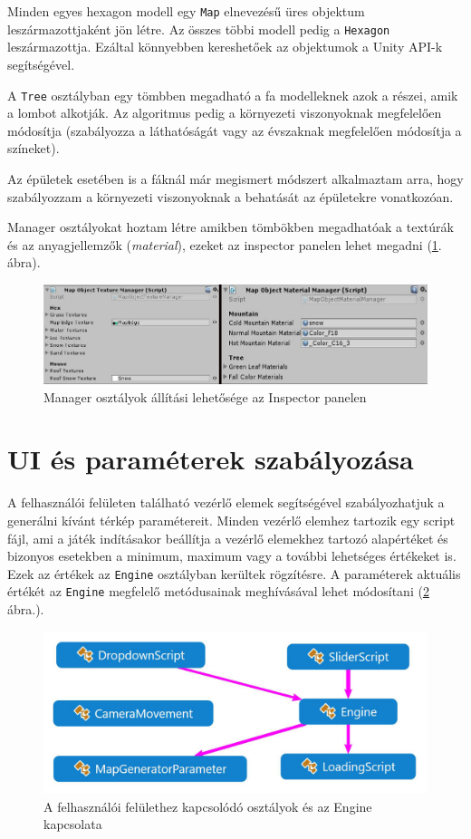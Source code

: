 Minden egyes hexagon modell egy \texttt{Map} elnevezésű üres objektum leszármazottjaként jön létre. Az összes többi modell pedig a \texttt{Hexagon} leszármazottja. Ezáltal könnyebben kereshetőek az objektumok a Unity API-k segítségével.

A \texttt{Tree} osztályban egy tömbben megadható a fa modelleknek azok a részei, amik a lombot alkotják. Az algoritmus pedig a környezeti viszonyoknak megfelelően módosítja (szabályozza a láthatóságát vagy az évszaknak megfelelően módosítja a színeket).

Az épületek esetében is a fáknál már megismert módszert alkalmaztam arra, hogy szabályozzam a környezeti viszonyoknak a behatását az épületekre vonatkozóan.

Manager osztályokat hoztam létre amikben tömbökben megadhatóak a textúrák és az anyagjellemzők (\textit{material}), ezeket az inspector panelen lehet megadni (\ref{fig:Managers}. ábra).

\begin{figure}[h!]
\centering
\includegraphics[scale=0.45]{kepek/Managers.jpg}
\caption{Manager osztályok állítási lehetősége az Inspector panelen}
\label{fig:Managers}
\end{figure}

\section{UI és paraméterek szabályozása}

A felhasználói felületen található vezérlő elemek segítségével szabályozhatjuk a generálni kívánt térkép paramétereit. Minden vezérlő elemhez tartozik egy script fájl, ami a játék indításakor beállítja a vezérlő elemekhez tartozó alapértéket és bizonyos esetekben a minimum, maximum vagy a további lehetséges értékeket is. Ezek az értékek az \texttt{Engine} osztályban kerültek rögzítésre. A paraméterek aktuális értékét az \texttt{Engine} megfelelő metódusainak meghívásával lehet módosítani (\ref{fig:UI} ábra.).

\begin{figure}[h!]
\centering
\includegraphics[scale=0.3]{kepek/White_UI.JPG}
\caption{A felhasználói felülethez kapcsolódó osztályok és az Engine kapcsolata}
\label{fig:UI}
\end{figure}


